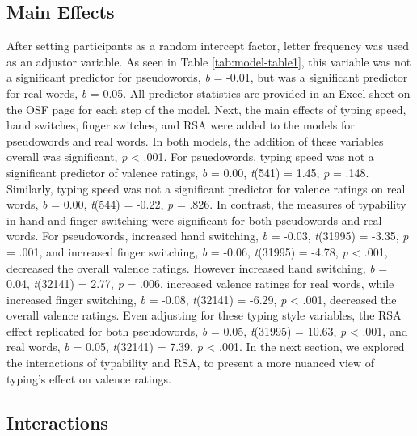 \documentclass[english,man]{apa6}
\theoremstyle{definition}
\theoremstyle{definition}
\theoremstyle{definition}
\theoremstyle{remark}
\begin{document}
\subsection{Main Effects}\label{main-effects}

After setting participants as a random intercept factor, letter
frequency was used as an adjustor variable. As seen in Table
\ref{tab:model-table1}, this variable was not a significant predictor
for pseudowords, \emph{b} = -0.01, but was a significant predictor for
real words, \emph{b} = 0.05. All predictor statistics are provided in an
Excel sheet on the OSF page for each step of the model. Next, the main
effects of typing speed, hand switches, finger switches, and RSA were
added to the models for pseudowords and real words. In both models, the
addition of these variables overall was significant, \emph{p}
\textless{} .001. For psuedowords, typing speed was not a significant
predictor of valence ratings, \emph{b} = 0.00, \emph{t}(541) = 1.45,
\emph{p} = .148. Similarly, typing speed was not a significant predictor
for valence ratings on real words, \emph{b} = 0.00, \emph{t}(544) =
-0.22, \emph{p} = .826. In contrast, the measures of typability in hand
and finger switching were significant for both pseudowords and real
words. For pseudowords, increased hand switching, \emph{b} = -0.03,
\emph{t}(31995) = -3.35, \emph{p} = .001, and increased finger
switching, \emph{b} = -0.06, \emph{t}(31995) = -4.78, \emph{p}
\textless{} .001, decreased the overall valence ratings. However
increased hand switching, \emph{b} = 0.04, \emph{t}(32141) = 2.77,
\emph{p} = .006, increased valence ratings for real words, while
increased finger switching, \emph{b} = -0.08, \emph{t}(32141) = -6.29,
\emph{p} \textless{} .001, decreased the overall valence ratings. Even
adjusting for these typing style variables, the RSA effect replicated
for both pseudowords, \emph{b} = 0.05, \emph{t}(31995) = 10.63, \emph{p}
\textless{} .001, and real words, \emph{b} = 0.05, \emph{t}(32141) =
7.39, \emph{p} \textless{} .001. In the next section, we explored the
interactions of typability and RSA, to present a more nuanced view of
typing's effect on valence ratings.

\subsection{Interactions}\label{interactions}
\end{document}
